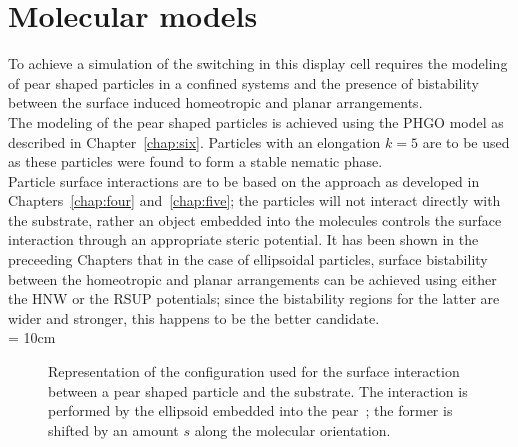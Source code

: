 

\section{Molecular models}
\label{s:GBP_RSUP_model}

To achieve a simulation of the switching in this
display cell requires the modeling of pear shaped particles in a
confined systems and the presence of bistability between the surface induced 
homeotropic and planar arrangements.\\
The modeling of the pear shaped particles is achieved using the PHGO model as described in
Chapter~\ref{chap:six}. Particles with an elongation $k=5$ are to be used as 
these particles were found to form a stable nematic phase.\\
Particle surface interactions are to be based on the approach as developed in Chapters~\ref{chap:four}
and~\ref{chap:five}; the particles will not interact directly with the substrate, rather an object 
embedded into the molecules controls the surface interaction through an appropriate steric potential. 
It has been shown in the preceeding
Chapters that in the case of ellipsoidal particles, surface bistability between the homeotropic
and planar arrangements can be achieved 
using either the HNW or the RSUP potentials; since the bistability regions for the latter are
wider and stronger, this happens to be the better candidate.\\

\picW = 10cm
\begin{figure}
	\centering
	\caption{Representation of the configuration used for the surface interaction between a
	pear shaped particle and the substrate. The interaction is performed by the ellipsoid
	embedded into the pear~; the former is  shifted by an amount $s$ along the molecular
	orientation.}
	\label{fig:PSUConfig}
\end{figure}


